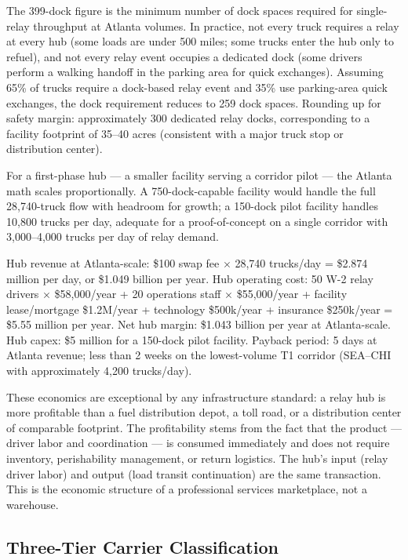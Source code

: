The 399-dock figure is the minimum number of dock spaces required for single-relay throughput at Atlanta volumes. In practice, not every truck requires a relay at every hub (some loads are under 500 miles; some trucks enter the hub only to refuel), and not every relay event occupies a dedicated dock (some drivers perform a walking handoff in the parking area for quick exchanges). Assuming 65\% of trucks require a dock-based relay event and 35\% use parking-area quick exchanges, the dock requirement reduces to 259 dock spaces. Rounding up for safety margin: approximately 300 dedicated relay docks, corresponding to a facility footprint of 35--40 acres (consistent with a major truck stop or distribution center).

For a first-phase hub --- a smaller facility serving a corridor pilot --- the Atlanta math scales proportionally. A 750-dock-capable facility would handle the full 28,740-truck flow with headroom for growth; a 150-dock pilot facility handles 10,800 trucks per day, adequate for a proof-of-concept on a single corridor with 3,000--4,000 trucks per day of relay demand.

Hub revenue at Atlanta-scale: \$100 swap fee $\times$ 28,740 trucks/day = \$2.874 million per day, or \$1.049 billion per year. Hub operating cost: 50 W-2 relay drivers $\times$ \$58,000/year + 20 operations staff $\times$ \$55,000/year + facility lease/mortgage \$1.2M/year + technology \$500k/year + insurance \$250k/year = \$5.55 million per year. Net hub margin: \$1.043 billion per year at Atlanta-scale. Hub capex: \$5 million for a 150-dock pilot facility. Payback period: 5 days at Atlanta revenue; less than 2 weeks on the lowest-volume T1 corridor (SEA--CHI with approximately 4,200 trucks/day).

These economics are exceptional by any infrastructure standard: a relay hub is more profitable than a fuel distribution depot, a toll road, or a distribution center of comparable footprint. The profitability stems from the fact that the product --- driver labor and coordination --- is consumed immediately and does not require inventory, perishability management, or return logistics. The hub's input (relay driver labor) and output (load transit continuation) are the same transaction. This is the economic structure of a professional services marketplace, not a warehouse.

\subsection{Three-Tier Carrier Classification}

